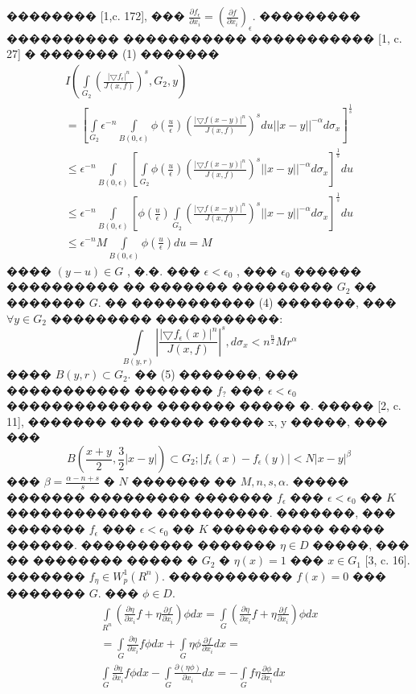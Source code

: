 \documentclass[a5paper, 12pt, openbib]{report}
\begin{document}
�������� [1,c. 172], ��� $\frac{\partial f_\epsilon}{\partial x_i}=\left(\frac{\partial f}{\partial x_i}\right)_\epsilon$. ��������� ���������� ����������� ����������� [1, c. 27] � ������� (1) ������� 
\begin{multline}
I\left(\int\limits_{G_2}\left(\frac{|\bigtriangledown f_{\epsilon}|^{n}}{J(x,f)}\right)^s, G_{2},y\right)\\
=\left[ \int\limits_{G_2}\epsilon^{-n}\int\limits_{B(0,\epsilon)}\phi\left(\frac{u}{\epsilon}\right)\left(\frac{|\bigtriangledown f(x-y)|^{n}}{J(x,f)}\right)^{s}
du||x-y||^{-\alpha}d\sigma_{x}\right]^{\frac{1}{s}}\\
\leq\epsilon^{-n}\int\limits_{B(0,\epsilon)}\left[\int\limits_{G_2}\phi\left(\frac{u}{\epsilon}\right)\left(\frac{|\bigtriangledown f(x-y)|^{n}}{J(x,f)}\right)^{s}||x-y||^{-\alpha}d\sigma_{x}\right]^{\frac{1}{s}}du
\\\leq\epsilon^{-n}\int\limits_{B(0,\epsilon)}\left[\phi\left(\frac{u}{\epsilon}\right)\int\limits_{G_2}\left(\frac{|\bigtriangledown f(x-y)|^{n}}{J(x,f)}\right)^{s}||x-y||^{-\alpha}d\sigma_{x}\right]^{\frac{1}{s}}du\\
\leq\epsilon^{-n}M\int\limits_{B(0,\epsilon)}\phi\left(\frac{u}{\epsilon}\right)du=M
\end{multline}
���� $(y-u)\in G$ , �.�. ��� $\epsilon<\epsilon_0$ , ��� $\epsilon_0$ ������ ���������� �� ������� ��������� $G_2$ �� ������� $G$. �� ����������� (4) �������, ��� $\forall y\in G_2$ ��������� �����������:
\begin{equation}
\int\limits_{B(y,r)}\left|\frac{|\bigtriangledown f_{\epsilon}(x)|^{n}}{J(x,f)}\right|^s, d\sigma_{x}<n^{\frac{n}{2}}Mr^\alpha
\end{equation}
���� $B(y,r)\subset G_2$.
�� (5) �������, ��� ����������� ������� $f_?$ ��� $\epsilon<\epsilon_0$ ������������� ������� ����� �. ����� [2, c. 11], ������� ��� ����� ����� x, y �����, ��� ��� 
$$
B\left(\frac{x+y}{2},\frac{3}{2}|x-y|\right)\subset G_{2}; |f_{\epsilon}(x)-f_{\epsilon}(y)|<N|x-y|^\beta
$$
��� $\beta=\frac{\alpha-n+s}{s}$ � $N$ ������� �� $M,n,s,\alpha$.
����� ������� ��������� ������� $f_\epsilon$ ��� $\epsilon<\epsilon_0$ �� $K$ ������������� ����������. �������, ��� ������� $f_\epsilon$ ��� $\epsilon<\epsilon_0$ �� $K$ ���������� ����� ������. ���������� ������� $\eta\in D$ �����, ��� �� �������� ����� � $G_2$ �  $\eta(x)=1$ ��� $x\in G_1$ [3, c. 16]. ������� $f_{\eta}\in W_{p}^{1} (R^n)$. ����������� $f(x)=0$ ��� ������� $G$. ��� $\phi\in D$.
\begin{multline}
\int\limits_{R^n}\left(\frac{\partial\eta}{\partial x_i}f+\eta\frac{\partial f}{\partial x_i}\right)\phi dx
= \int\limits_{G}\left(\frac{\partial\eta}{\partial x_i}f+\eta\frac{\partial f}{\partial x_i}\right)\phi dx\\
=\int\limits_{G}\frac{\partial\eta}{\partial x_i}f\phi dx+\int\limits_{G}\eta\phi\frac{\partial f}{\partial x_i}dx=\\
\int\limits_{G}\frac{\partial\eta}{\partial x_i}f\phi dx-\int\limits_{G}\frac{\partial(\eta\phi)}{\partial x_i}dx=-\int\limits_{G}f\eta\frac{\partial\phi}{\partial x_i}dx\\
\end{multline}
\end{document}
